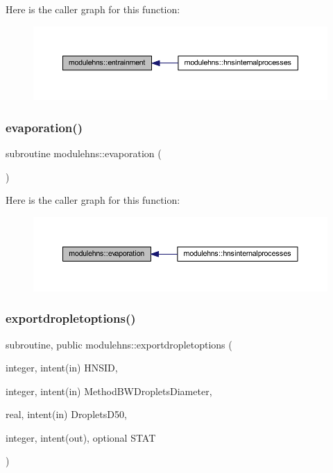 Here is the caller graph for this function\+:\nopagebreak
\begin{figure}[H]
\begin{center}
\leavevmode
\includegraphics[width=350pt]{namespacemodulehns_a13e99017fa3f908e775b29ff9c3fee14_icgraph}
\end{center}
\end{figure}
\mbox{\label{namespacemodulehns_aea7fc4ad80f75c5e51fdf077a3c341c8}} 
\subsubsection{\texorpdfstring{evaporation()}{evaporation()}}
{\footnotesize\ttfamily subroutine modulehns\+::evaporation (\begin{DoxyParamCaption}{ }\end{DoxyParamCaption})\hspace{0.3cm}{\ttfamily [private]}}

Here is the caller graph for this function\+:\nopagebreak
\begin{figure}[H]
\begin{center}
\leavevmode
\includegraphics[width=350pt]{namespacemodulehns_aea7fc4ad80f75c5e51fdf077a3c341c8_icgraph}
\end{center}
\end{figure}
\mbox{\label{namespacemodulehns_a2dabe744302beb8c44eef0780790d14a}} 
\subsubsection{\texorpdfstring{exportdropletoptions()}{exportdropletoptions()}}
{\footnotesize\ttfamily subroutine, public modulehns\+::exportdropletoptions (\begin{DoxyParamCaption}\item[{integer, intent(in)}]{H\+N\+S\+ID,  }\item[{integer, intent(in)}]{Method\+B\+W\+Droplets\+Diameter,  }\item[{real, intent(in)}]{Droplets\+D50,  }\item[{integer, intent(out), optional}]{S\+T\+AT }\end{DoxyParamCaption})}

